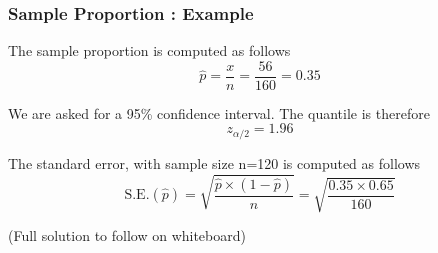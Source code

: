 \begin{frame}
\frametitle{ Sample Proportion : Example}


\begin{description}
\item[Point Estimate] The sample proportion is computed as follows
\[ \hat{p} = \frac{x}{n} = \frac{56}{160} = 0.35\]
\item[Quantile] We are asked for a 95\% confidence interval. The quantile is therefore
\[ z_{\alpha/2} =1.96\]
\item[Standard Error] The standard error, with sample size n=120 is computed as follows
\[ \mbox{S.E.}(\hat{p}) = \sqrt{\frac{\hat{p} \times (1-\hat{p})}{n}} =  \sqrt{\frac{0.35 \times 0.65}{160}}\]
\item (Full solution to follow on whiteboard)
\end{description}
\end{frame}

